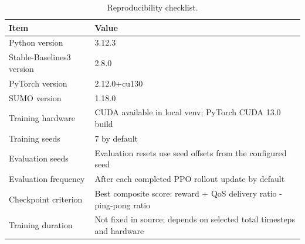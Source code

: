 \begin{table}[htbp]
\centering
\caption{Reproducibility checklist.}
\label{tab:reproducibility_checklist}
\begin{tabular}{ll}
\toprule
\textbf{Item} & \textbf{Value} \\
\midrule
Python version & 3.12.3 \\
Stable-Baselines3 version & 2.8.0 \\
PyTorch version & 2.12.0+cu130 \\
SUMO version & 1.18.0 \\
Training hardware & CUDA available in local venv; PyTorch CUDA 13.0 build \\
Training seeds & 7 by default \\
Evaluation seeds & Evaluation resets use seed offsets from the configured seed \\
Evaluation frequency & After each completed PPO rollout update by default \\
Checkpoint criterion & Best composite score: reward + QoS delivery ratio - ping-pong ratio \\
Training duration & Not fixed in source; depends on selected total timesteps and hardware \\
\bottomrule
\end{tabular}
\end{table}
